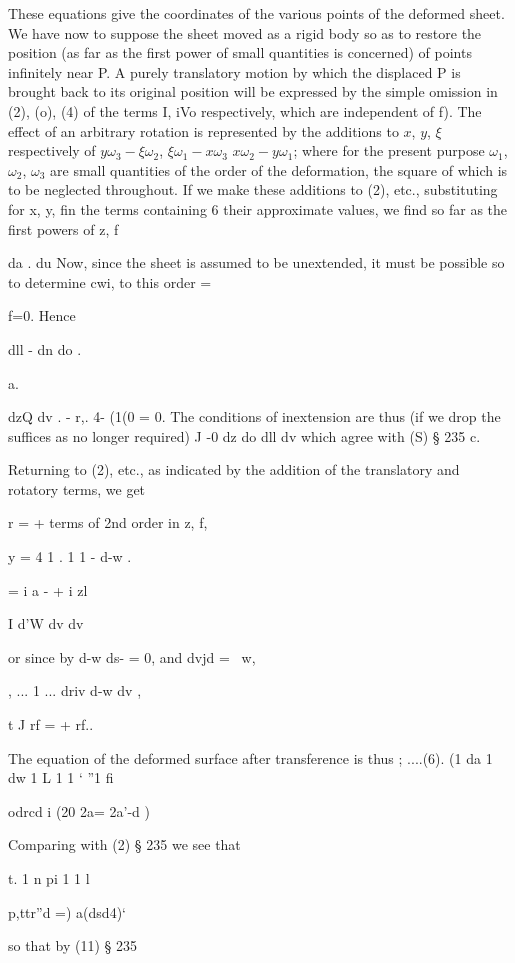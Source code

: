 These equations give the coordinates of the various points of the deformed
sheet. We have now to suppose the sheet moved as a rigid body so as to restore
the position (as far as the first power of small quantities is concerned) of
points infinitely near P. A purely translatory motion by which the displaced P
is brought back to its original position will be expressed by the simple
omission in (2), (o), (4) of the terms I, iVo respectively, which are
independent of f).
The effect of an arbitrary rotation is represented by the
additions to \(x\), \(y\), \(\xi\) respectively of
\(y \omega_3-\xi \omega_2\), \(\xi \omega_1- x \omega_3\)
\(x \omega_2- y\omega_1\); where for the present purpose
\(\omega_1\), \(\omega_2\), \(\omega_3\)
are small quantities of the order of the deformation, the
square of which is to be neglected throughout. If we make these additions to
(2), etc., substituting for x, y, fin the terms containing 6 their approximate
values, we find so far as the first powers of z, f

da . du Now, since the sheet is assumed to be unextended, it must be possible
so to determine cwi,  to this order =

f=0. Hence

dll - dn do .

a.

dzQ dv .
- r,. 4- (1(0 = 0.
The conditions of inextension are thus (if we drop the suffices as no longer required)
J -0 dz do dll dv which agree with (S) § 235 c.

Returning to (2), etc., as indicated by the addition of the translatory and
rotatory terms, we get

r =  + terms of 2nd order in z, f,

y = 4 1 . 1 1 - d-w .

 = i a - + i  zl

I d'W dv dv

or since by  d-w ds- = 0, and dvjd = ~w,

 , ... 1 ... driv d-w dv ,

t J rf =  + rf..

The equation of the deformed surface after transference is thus ; ....(6).  (1
da 1 dw 1 L 1 1 ‘ ''1 fi

 odrcd i  (20 2a=  2a'-d )

Comparing with (2) § 235 we see that

t. 1 n pi 1 1  l

 p,ttr''d =) a(dsd4)‘

so that by (11) § 235

